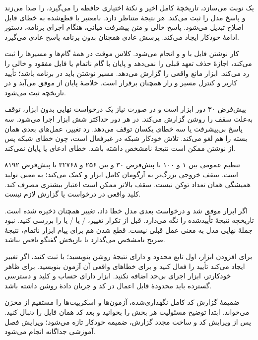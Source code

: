  یک نوبت می‌سازد، تاریخچهٔ کامل اخیر و نکتهٔ اختیاری حافظه را می‌گیرد، 
 را صدا می‌زند و پاسخ مدل را ثبت می‌کند. هر 
 نتیجهٔ متناظر دارد. 
 نامعتبر یا قطع‌شده به خطای قابل اصلاح تبدیل می‌شود. پاسخ خالی و متن پیشرفت میانی، هنگام اجرای برنامه، دستور ادامهٔ خودکار ایجاد می‌کند. پرسش عادی همچنان بدون برنامه پاسخ عادی می‌گیرد.

کار نوشتن فایل با 
 و 
 و 
 انجام می‌شود. کلاس موقت 
 در 
 همهٔ گام‌ها و مسیرها را ثبت می‌کند، اجازهٔ حذف تعهد قبلی را نمی‌دهد و پایان با گام ناتمام یا فایل مفقود و خالی را رد می‌کند. ابزار 
 مانع واقعی را گزارش می‌دهد. مسیر نوشتن باید در برنامه باشد؛ تأیید کاربر و کنترل مسیر و راز همچنان برقرار است. خلاصهٔ پایان از 
 موفق می‌آید و در تاریخچه ثبت می‌شود.

پیش‌فرض ۳۰ دور ابزار است و در صورت نیاز یک درخواست نهایی بدون ابزار، توقف به‌علت سقف را روشن گزارش می‌کند. در هر دور حداکثر شش ابزار اجرا می‌شود. سه پاسخ بی‌پیشرفت یا سه خطای یکسان توقف می‌دهد. رد تغییر، عمل‌های بعدی همان بسته را هم لغو می‌کند. تلاش خودکار شبکه در 
 غیرفعال است، چون خطای شبکه پس از نوشتن ممکن است نتیجهٔ نامشخص داشته باشد. خطای 
 ادعای 
 یا پایان نمی‌کند.

تنظیم عمومی 
 بین ۱ و ۱۰۰ با پیش‌فرض ۳۰ و 
 بین ۲۵۶ و ۳۲۷۶۸ با پیش‌فرض ۸۱۹۲ است. سقف خروجی بزرگ‌تر به آرگومان کامل ابزار 
 و 
 کمک می‌کند؛ به معنی تولید همیشگی همان تعداد توکن نیست. سقف بالاتر ممکن است اعتبار بیشتری مصرف کند. کلید واقعی در درخواست یا گزارش لازم نیست.

اگر ابزار موفق شد و درخواست بعدی مدل خطا داد، تغییر همچنان ذخیره شده است. تاریخچه نتیجهٔ تأییدشده را نگه می‌دارد. قبل از تکرار تغییر، /
 یا /
 یا 
 را بررسی کنید. نبود جملهٔ نهایی مدل به معنی 
 عمل قبلی نیست. قطع شدن هم برای پیام ابزار ناتمام، نتیجهٔ صریح نامشخص می‌گذارد تا بازپخش گفتگو ناقص نباشد.

برای افزودن ابزار، اول تابع محدود و دارای نتیجهٔ روشن بنویسید؛ با 
 ثبت کنید، اگر تغییر ایجاد می‌کند تأیید را فعال کنید و برای خطاهای واقعی آن آزمون بنویسید. برای ظاهر خودکارتر، ابزار اجرای 
 بی‌حد اضافه نکنید. ابزار دارای حساب و کلید و دسترسی گسترده باید محدودهٔ قابل اعمال در کد و جریان دادهٔ روشن داشته باشد.

ضمیمهٔ گزارش کد کامل نگهداری‌شده، آزمون‌ها و اسکریپت‌ها را مستقیم از مخزن می‌خواند. ابتدا توضیح مسئولیت هر بخش را بخوانید و بعد کد همان فایل را دنبال کنید. پس از ویرایش کد و ساخت مجدد گزارش، ضمیمه خودکار تازه می‌شود؛ ویرایش فصل آموزشی جداگانه انجام می‌شود.


